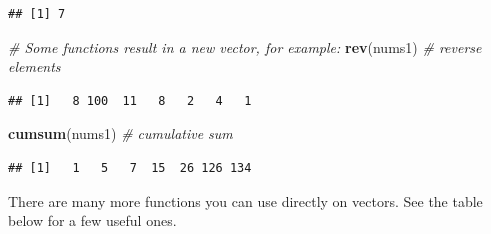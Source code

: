 \documentclass[]{book}
\newenvironment{Shaded}{\begin{snugshade}}{\end{snugshade}}
\newcommand{\CommentTok}[1]{\textcolor[rgb]{0.56,0.35,0.01}{\textit{#1}}}
\newcommand{\KeywordTok}[1]{\textcolor[rgb]{0.13,0.29,0.53}{\textbf{#1}}}
\newcommand{\NormalTok}[1]{#1}
\begin{document}
\begin{verbatim}
## [1] 7
\end{verbatim}

\begin{Shaded}
\begin{Highlighting}[]
\CommentTok{# Some functions result in a new vector, for example:}
\KeywordTok{rev}\NormalTok{(nums1)  }\CommentTok{# reverse elements}
\end{Highlighting}
\end{Shaded}

\begin{verbatim}
## [1]   8 100  11   8   2   4   1
\end{verbatim}

\begin{Shaded}
\begin{Highlighting}[]
\KeywordTok{cumsum}\NormalTok{(nums1)  }\CommentTok{# cumulative sum}
\end{Highlighting}
\end{Shaded}

\begin{verbatim}
## [1]   1   5   7  15  26 126 134
\end{verbatim}

There are many more functions you can use directly on vectors. See the table below for a few useful ones.
\end{document}
